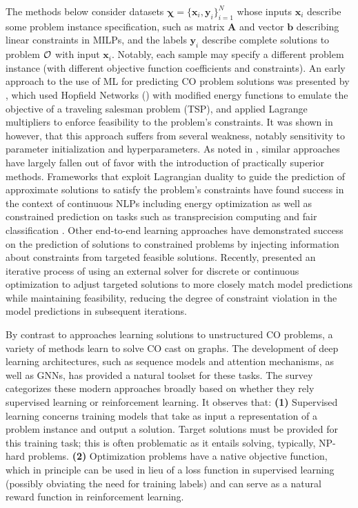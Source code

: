 The methods below consider datasets $\bm{\chi} = \{\bm{x}_i, \bm{y}_i\}_{i=1}^N$ whose inputs $\bm{x}_i$ describe some problem instance 
specification, such as matrix $\bm{A}$ and vector $\bm{b}$ describing linear constraints in MILPs, 
and the labels $\bm{y}_i$ describe complete solutions to problem ${\cal O}$ with input $\bm{x}_i$. 
Notably, each sample may specify a different problem instance (with 
different objective function coefficients and constraints).
An early approach to the use of ML for predicting CO problem solutions was presented by , which used Hopfield Networks () with modified energy functions to emulate the objective of a traveling salesman problem (TSP), and applied Lagrange multipliers to enforce feasibility to the problem's constraints. It was shown in  however, that this approach suffers from several weakness, notably sensitivity to parameter initialization and hyperparameters.  As noted in  , similar approaches have largely fallen out of favor with the introduction of practically superior methods. 
Frameworks that exploit Lagrangian duality to guide the prediction of approximate solutions to satisfy the problem's constraints have found success in the context of continuous NLPs including energy optimization  as well as constrained prediction on tasks such as transprecision computing and fair classification .
Other end-to-end learning approaches have demonstrated success on the prediction  of solutions to constrained problems by injecting information about constraints from targeted feasible solutions. Recently,  presented an iterative process of using an external solver for discrete or continuous optimization to adjust targeted solutions to more closely match model predictions while maintaining feasibility, reducing the degree of constraint violation in the model predictions in subsequent iterations.

By contrast to approaches learning solutions to unstructured CO problems, a variety of methods learn to solve CO cast on graphs. The development of deep learning architectures, such as sequence models and attention mechanisms, as well as GNNs, has provided a natural toolset for these tasks. 
The survey categorizes these modern approaches broadly based on whether they rely supervised learning or reinforcement learning. It observes that: {\bf (1)} Supervised learning concerns training models that take as input a representation of a problem instance and output a solution. Target solutions must be provided for this training task; this is often problematic as it entails solving, typically, NP-hard problems. {\bf (2)} Optimization problems have a native objective function, which in principle can be used in lieu of a loss function in supervised learning (possibly obviating the need for training labels) and can serve as a natural reward function in reinforcement learning.

